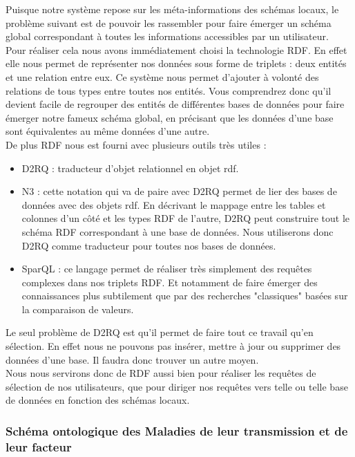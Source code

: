 \documentclass[12pt]{article}
\begin{document}
	Puisque notre système repose sur les méta-informations des schémas locaux, le problème suivant est de pouvoir les rassembler pour faire émerger un schéma global correspondant à toutes les informations accessibles par un utilisateur.\\
	Pour réaliser cela nous avons immédiatement choisi la technologie RDF. En effet elle nous permet de représenter nos données sous forme de triplets : deux entités et une relation entre eux. Ce système nous permet d'ajouter à volonté des relations de tous types entre toutes nos entités. Vous comprendrez donc qu'il devient facile de regrouper des entités de différentes bases de données pour faire émerger notre fameux schéma global, en précisant que les données d'une base sont équivalentes au même données d'une autre.\\
	De plus RDF nous est fourni avec plusieurs outils très utiles :\\
	\begin{itemize}
		\item D2RQ : traducteur d'objet relationnel en objet rdf.
		\item N3 : cette notation qui va de paire avec D2RQ permet de lier des bases de données avec des objets rdf. En décrivant le mappage entre les tables et colonnes d'un côté et les types RDF de l'autre, D2RQ peut construire tout le schéma RDF correspondant à une base de données. Nous utiliserons donc D2RQ comme traducteur pour toutes nos bases de données.\\
		\item SparQL : ce langage permet de réaliser très simplement des requêtes complexes dans nos triplets RDF. Et notamment de faire émerger des connaissances plus subtilement que par des recherches "classiques" basées sur la comparaison de valeurs.\\
	\end{itemize}
	Le seul problème de D2RQ est qu'il permet de faire tout ce travail qu'en sélection. En effet nous ne pouvons pas insérer, mettre à jour ou supprimer des données d'une base. Il faudra donc trouver un autre moyen.\\
	Nous nous servirons donc de RDF aussi bien pour réaliser les requêtes de sélection de nos utilisateurs, que pour diriger nos requêtes vers telle ou telle base de données en fonction des schémas locaux.\\

\subsubsection{Schéma ontologique des Maladies de leur transmission et de leur facteur}
\end{document}
